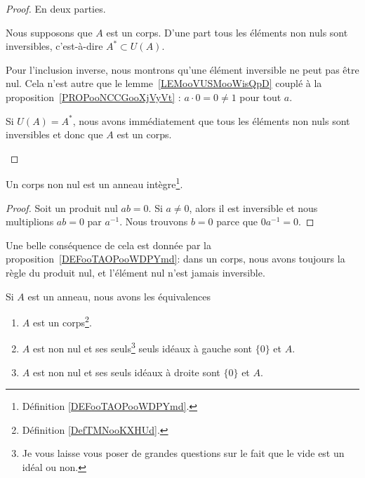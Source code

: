 \begin{proof}
    En deux parties.
    \begin{subproof}
        \item[Sens direct]
            Nous supposons que \( A\) est un corps. D'une part tous les éléments non nuls sont inversibles, c'est-à-dire \( A^*\subset U(A)\).
            
            Pour l'inclusion inverse, nous montrons qu'une élément inversible ne peut pas être nul. Cela n'est autre que le lemme~\ref{LEMooVUSMooWisQpD} couplé à la proposition~\ref{PROPooNCCGooXjVyVt} : \( a\cdot 0=0\neq 1\) pour tout \( a\).
        \item[Sens inverse]
            Si \( U(A)=A^*\), nous avons immédiatement que tous les éléments non nuls sont inversibles et donc que \( A\) est un corps.
    \end{subproof}
\end{proof}

\begin{lemma}       \label{LemAnnCorpsnonInterdivzer}  \label{EXooMXNTooZaRPPi}
    Un corps non nul est un anneau intègre\footnote{Définition \ref{DEFooTAOPooWDPYmd}.}.
\end{lemma}

\begin{proof}
    Soit un produit nul \( ab=0\). Si \( a\neq 0\), alors il est inversible et nous multiplions \( ab=0\) par \( a^{-1}\). Nous trouvons \( b=0\) parce que \( 0a^{-1}=0\).
\end{proof}
Une belle conséquence de cela est donnée par la proposition~\ref{DEFooTAOPooWDPYmd}: dans un corps, nous avons toujours la règle du produit nul, et l'élément nul n'est jamais inversible.

\begin{proposition}     \label{AnnCorpsIdeal}\label{PROPooUOCVooZGAVVk}
    Si \( A\) est un anneau, nous avons les équivalences
    \begin{enumerate}
        \item       \label{ITEMooLAAVooXhTcMe}
            \( A\) est un corps\footnote{Définition \ref{DefTMNooKXHUd}.}.
        \item       \label{ITEMooDGZIooRopYGx}
            \( A\) est non nul et ses seuls\footnote{Je vous laisse vous poser de grandes questions sur le fait que le vide est un idéal ou non.} seuls idéaux à gauche sont \( \{ 0 \}\) et \( A\).
        \item       \label{ITEMooLPWHooDJpTbR}
            \( A\) est non nul et ses seuls idéaux à droite sont \( \{ 0 \}\) et \( A\).
    \end{enumerate}
\end{proposition}

